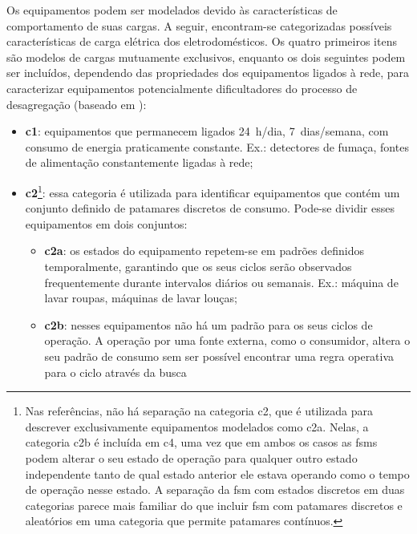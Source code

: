 Os equipamentos podem ser modelados devido às características de
comportamento de suas cargas. A seguir, encontram-se categorizadas possíveis
características de carga elétrica dos eletrodomésticos. Os quatro primeiros
itens são modelos de cargas mutuamente exclusivos, enquanto os dois seguintes
podem ser incluídos, dependendo das propriedades dos equipamentos ligados à
rede, para caracterizar equipamentos potencialmente dificultadores do processo
de desagregação (baseado em \cite{
nilm_hart_1992_8,nilm_baranski_genetic_base_2003_19,
nilm_zeifman_review_2011,nilm_zeifman_vast_hisample_pdfmerge_2011,
nilm_apresentacao_review_2011,nilm_liang_pt2_2010_40,
nilm_liang_pt1_2010_34}):

\begin{itemize}
\item \textbf{\Gls{c1}}: equipamentos que permanecem
ligados 24~h/dia, 7~dias/semana, com consumo de energia praticamente
constante. Ex.: detectores de fumaça, fontes de alimentação
constantemente ligadas à rede;
\item \textbf{\gls{c2}}\footnote{Nas referências, não há separação na
categoria \gls{c2}, que é utilizada para descrever exclusivamente
equipamentos modelados como \acs{c2a}. Nelas, a categoria
\acs{c2b} é incluída em \acs{c4}, uma vez que em ambos os
casos as \glspl{fsm} podem alterar o seu estado de operação para
qualquer outro estado independente tanto de qual estado anterior ele estava
operando como o tempo de operação nesse estado. A separação da
\gls{fsm} com estados discretos em duas categorias parece mais
familiar do que incluir \gls{fsm} com patamares discretos e
aleatórios em uma categoria que permite patamares
contínuos.\label{fn:subdivisao}}: essa categoria é utilizada
para identificar equipamentos que contém um conjunto definido de
patamares discretos de consumo. Pode-se dividir esses equipamentos
em dois conjuntos:
\begin{itemize}
\item \textbf{\gls{c2a}}: os estados do equipamento repetem-se em
padrões definidos temporalmente, garantindo que os seus ciclos serão
observados frequentemente durante intervalos diários ou semanais. Ex.:
máquina de lavar roupas, máquinas de lavar louças;
\item \textbf{\gls{c2b}}: nesses equipamentos não há
um padrão para os seus ciclos de operação. A operação por uma fonte
externa, como o consumidor, altera o seu padrão de consumo sem ser
possível encontrar uma regra operativa para o ciclo através da busca

\end{itemize}
\end{itemize}
